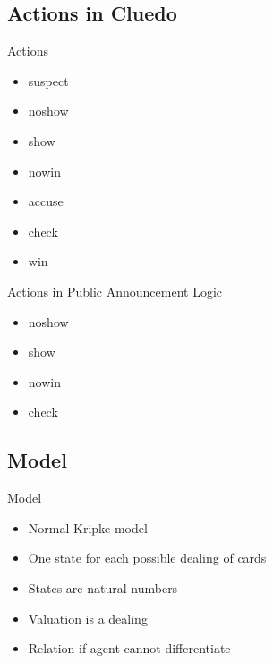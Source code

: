\subsection{Actions in Cluedo}
\begin{frame}{Actions}
    \begin{itemize}
        \item suspect
        \item noshow
        \item show
        \item nowin
        \item accuse
        \item check
        \item win
    \end{itemize}
\end{frame}

\begin{frame}{Actions in Public Announcement Logic}

    \pause

    \begin{itemize}
        \item noshow
        \item show
        \item nowin

        \vspace{5mm}
        \pause

        \item check
    \end{itemize}
\end{frame}

\subsection{Model}
\begin{frame}{Model}
    \begin{itemize}
        \item Normal Kripke model
        \item One state for each possible dealing of cards
        \item States are natural numbers
        \item Valuation is a dealing
        \item Relation if agent cannot differentiate
    \end{itemize}
\end{frame}


